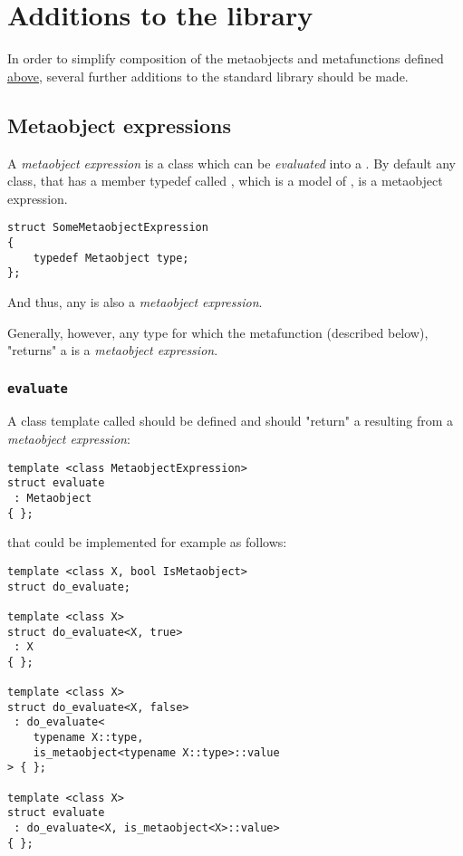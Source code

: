 \section{Additions to the library}
\label{section-Library}

In order to simplify composition of the metaobjects and metafunctions defined
\hyperref[section-all-Concepts]{above}, several further additions to the standard
library should be made.

\subsection{Metaobject expressions}

A {\em metaobject expression} is a class which can be {\em evaluated}
into a . By default any class, that has a member typedef
called \verb@type@, which is a model of , is a metaobject expression.

\begin{verbatim}
struct SomeMetaobjectExpression
{
	typedef Metaobject type;
};

\end{verbatim}

And thus, any  is also a {\em metaobject expression}.

Generally, however, any type for which the \verb@evaluate@ metafunction
(described below), "returns" a  is a {\em metaobject expression}.

\subsubsection{\texttt{evaluate}}

A class template called \verb@evaluate@ should be defined and should "return" a 
resulting from a {\em metaobject expression}:

\begin{verbatim}
template <class MetaobjectExpression>
struct evaluate
 : Metaobject
{ };
\end{verbatim}

that could be implemented for example as follows:

\begin{verbatim}
template <class X, bool IsMetaobject>
struct do_evaluate;

template <class X>
struct do_evaluate<X, true>
 : X
{ };

template <class X>
struct do_evaluate<X, false>
 : do_evaluate<
	typename X::type,
	is_metaobject<typename X::type>::value
> { };

template <class X>
struct evaluate
 : do_evaluate<X, is_metaobject<X>::value>
{ };

\end{verbatim}


